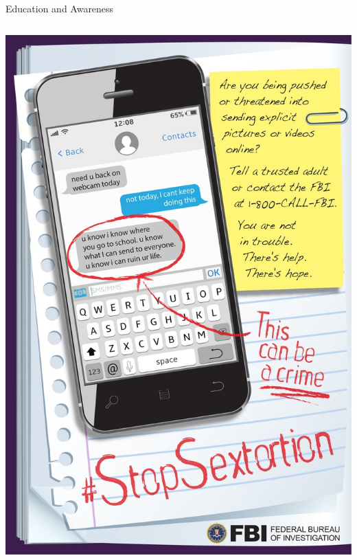 \documentclass[nobackground,dvipsnames,table,aspectratio=169]{beamer}
\begin{document}
\begin{frame}{Education and Awareness}
    \centering
    \begin{columns}
            \centering
            \includegraphics[height=0.8\textheight]{stop-sextortion-poster}
            \centering

\end{columns}
\end{frame}
\end{document}
